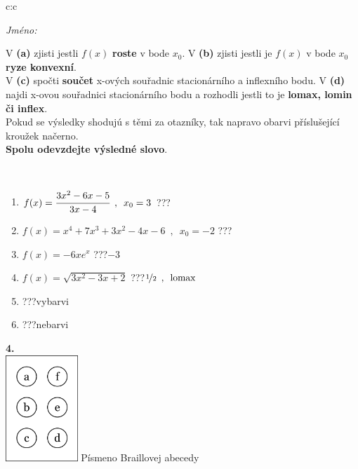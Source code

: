 \documentclass[10pt]{report}
\begin{document}
\begin{tabular}{c:c}
\begin{minipage}[c][104.5mm][t]{0.5\linewidth}
\begin{center}
\textit{Jméno:}\phantom{xxxxxxxxxxxxxxxxxxxxxxxxxxxxxxxxxxxxxxxxxxxxxxxxxxxxxxxxxxxxxxxxx}\\[5mm]
\begin{minipage}{0.95\linewidth}
\begin{center}
{\small V \textbf{(a)} zjisti jestli $f(x)$ \textbf{roste} v bode $x_0$. V \textbf{(b)} zjisti jestli je $f(x)$ v bode $x_0$ \textbf{ryze konvexní}.\\V \textbf{(c)} spočti \textbf{součet} x-ových souřadnic stacionárního a inflexního bodu. V \textbf{(d)} najdi x-ovou souřadnici stacionárního bodu a rozhodli jestli to je \textbf{lomax, lomin či inflex}.\\Pokud se výsledky shodujú s těmi za otazníky, tak napravo obarvi příslušející kroužek načerno.\\\textbf{Spolu odevzdejte výsledné slovo}}.
\end{center}
\end{minipage}
\\[1mm]
\begin{minipage}{0.79\linewidth}
\begin{center}
\begin{varwidth}{\linewidth}
\begin{enumerate}
\normalsize
\item $f(x)=\cfrac{3x^2-6x-5}{3x-4}\enspace , \enspace x_0=3$\quad \dotfill\; ???\;\dotfill \quad {}
\item $f(x)=x^4+7x^3+3x^2-4x-6\enspace , \enspace x_0=-2$\quad \dotfill\; ???\;\dotfill \quad {}
\item $f(x)=-6xe^{x}$\quad \dotfill\; ???\;\dotfill \quad $-3$
\item $f(x)=\sqrt{3x^2-3x+2}$\quad \dotfill\; ???\;\dotfill \quad $\nicefrac{1}{2}\enspace , \enspace\mathrm{lomax}$
\item \quad \dotfill\; ???\;\dotfill \quad vybarvi
\item \quad \dotfill\; ???\;\dotfill \quad nebarvi
\end{enumerate}
\end{varwidth}
\end{center}
\end{minipage}
\begin{minipage}{0.20\linewidth}
\begin{center}
{\Huge\bfseries 4.} \\[2mm]
\includegraphics[height=40mm]{../images/braille.png}
{\small Písmeno Braillovej abecedy}
\end{center}
\end{minipage}
\end{center}
\end{minipage}
%
\end{tabular}
\end{document}
